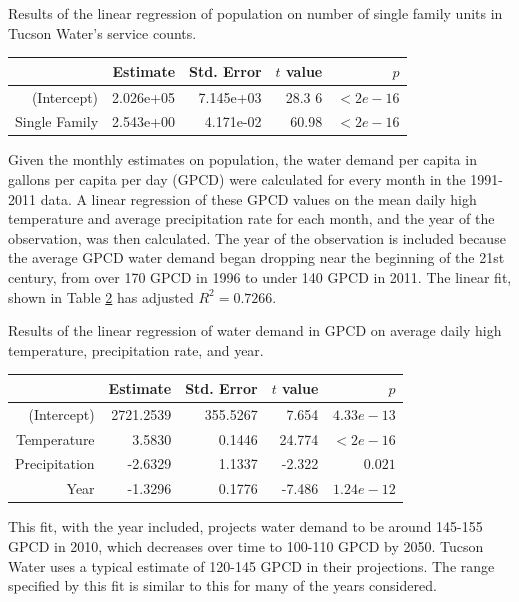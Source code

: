 \documentclass[opre,nonblindrev]{informs3} %
\begin{document}
\begin{table}
	\TABLE
	{
		Results of the linear regression of population on number of single family units in Tucson Water's service counts.
		\label{tb:population_linear_reg}
	}
	{\begin{tabular}{rrrrr}
		\hline
						   & Estimate  & Std. Error & $t$ value & $p$ \\
		\hline
		(Intercept)    & 2.026e+05 & 7.145e+03  & 28.3 6    & $<2e-16$ \\
		Single Family  & 2.543e+00 & 4.171e-02  & 60.98     & $<2e-16$ \\
		\hline
	\end{tabular}}
	{}
\end{table}

Given the monthly estimates on population, the water demand per capita in gallons per capita per day (GPCD) were calculated for every month in the 1991-2011 data.
A linear regression of these GPCD values on the mean daily high temperature and average precipitation rate for each month, and the year of the observation, was then calculated.
The year of the observation is included because the average GPCD water demand began dropping near the beginning of the 21st century, from over 170 GPCD in 1996 to under 140 GPCD in 2011.
The linear fit, shown in Table \ref{tb:gpcd_linear_reg} has adjusted $R^2 = 0.7266$.

\begin{table}
	\TABLE
	{
		Results of the linear regression of water demand in GPCD on average daily high temperature, precipitation rate, and year.
		\label{tb:gpcd_linear_reg}
	}
	{\begin{tabular}{rrrrr}
		\hline
						   & Estimate  & Std. Error & $t$ value & $p$ \\
		\hline
		(Intercept)    & 2721.2539 & 355.5267   & 7.654     & $4.33e-13$ \\
		Temperature    &   3.5830  & 0.1446     & 24.774    & $< 2e-16$\\
		Precipitation  &  -2.6329  & 1.1337     & -2.322    & $0.021$ \\
		Year           &  -1.3296  & 0.1776     & -7.486    & $1.24e-12$ \\
		\hline
	\end{tabular}}
	{}
\end{table}

This fit, with the year included, projects water demand to be around 145-155 GPCD in 2010, which decreases over time to 100-110 GPCD by 2050.
Tucson Water uses a typical estimate of 120-145 GPCD in their projections.
The range specified by this fit is similar to this for many of the years considered.
\end{document}
